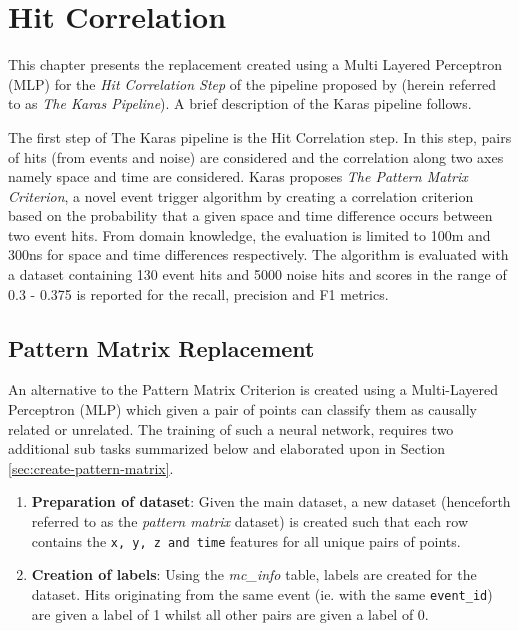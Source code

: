 
\chapter{Hit Correlation} %


\graphicspath{{./4-pm/figures/}}

% 
This chapter presents the replacement created using a Multi Layered
Perceptron (MLP) for the \textit{Hit Correlation Step} of the pipeline
proposed by \cite{karas2019data} (herein referred to as \textit{The
  Karas Pipeline}). A brief description of the Karas pipeline follows.

The first step of The Karas pipeline is the Hit Correlation step. In
this step, pairs of hits (from events and noise) are considered and
the correlation along two axes namely space and time are considered.
Karas proposes \textit{The Pattern Matrix Criterion}, a novel event
trigger algorithm by creating a correlation criterion based on the
probability that a given space and time difference occurs between two
event hits. From domain knowledge, the evaluation is limited to 100m
and 300ns for space and time differences respectively. The algorithm
is evaluated with a dataset containing 130 event hits and 5000 noise
hits and scores in the range of 0.3 - 0.375 is reported for the
recall, precision and F1 metrics.

\section{Pattern Matrix Replacement}
An alternative to the Pattern Matrix Criterion is created using a
Multi-Layered Perceptron (MLP) which given a pair of points can
classify them as causally related or unrelated. The training of such a
neural network, requires two additional sub tasks summarized below and
elaborated upon in Section \ref{sec:create-pattern-matrix}.

\begin{enumerate}
\item \textbf{Preparation of dataset}: Given the main dataset, a new
  dataset (henceforth referred to as the \textit{pattern matrix}
  dataset) is created such that each row contains the \texttt{x, y, z
    and time} features for all unique pairs of points.
\item \textbf{Creation of labels}: Using the \textit{mc\_info} table,
  labels are created for the dataset. Hits originating from the same
  event (ie. with the same \texttt{event\_id}) are given a label of 1
  whilst all other pairs are given a label of 0.
\end{enumerate}

